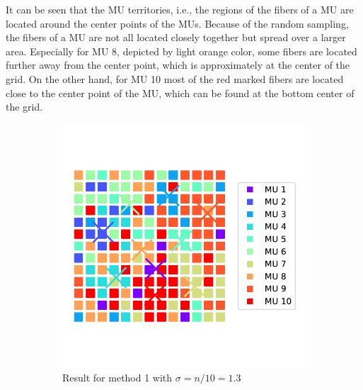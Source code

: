 It can be seen that the MU territories, i.e., the regions of the fibers of a MU are located around the center points of the MUs. Because of the random sampling, the fibers of a MU are not all located closely together but spread over a larger area. Especially for MU 8, depicted by light orange color, some fibers are located further away from the center point, which is approximately at the center of the grid. On the other hand, for MU 10 most of the red marked fibers are located close to the center point of the MU, which can be found at the bottom center of the grid.

\begin{figure}%
  \centering%
  \begin{subfigure}[t]{0.48\textwidth}%
    \centering%
    \includegraphics[width=\textwidth]{images/motor_unit_assignment/MU_fibre_distribution_13x13_10_2d_fiber_distribution.pdf}%
    \caption{Result for method 1 with $\sigma = n/10 = 1.3$}%
    \label{fig:MU_fibre_distribution_13x13_10_2d_fiber_distribution}%
  \end{subfigure}
  \quad
  \begin{subfigure}[t]{0.48\textwidth}%
    \centering%

\end{subfigure}
\end{figure}
